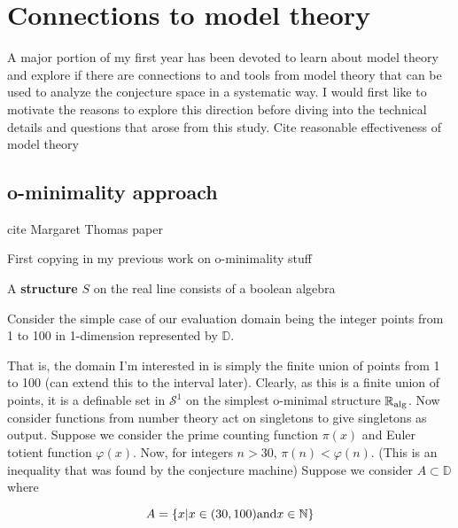 \section{Connections to model theory}
A major portion of my first year has been devoted to learn about model theory and explore if there are connections to and tools from model theory that can be used to analyze the conjecture space in a systematic way. I would first like to motivate the reasons to explore this direction before diving into the technical details and questions that arose from this study.
Cite reasonable effectiveness of model theory \cite{baldwin2019reasonable}

% 
\subsection{o-minimality approach}

cite Margaret Thomas paper \cite{thomasConvergenceResultsFunction2012}

First copying in my previous work on o-minimality stuff

\begin{definition}[Structure]
    A \textbf{structure} $S$ on the real line consists of a boolean algebra
\end{definition}

Consider the simple case of our evaluation domain being the integer points from 1 to 100 in 1-dimension represented by $\mathbb{D}$.

That is, the domain I'm interested in is simply the finite union of points from 1 to 100 (can extend this to the interval later). Clearly, as this is a finite union of points, it is a definable set in $\mathcal{S}^1$ on the simplest o-minimal structure $\mathbb{R}_{\text{alg}}$.
Now consider functions from number theory act on singletons to give singletons as output. Suppose we consider the prime counting function $\pi(x)$ and Euler totient function $\varphi(x)$. Now, for integers $n > 30$, $\pi(n) < \varphi(n)$. (This is an inequality that was found by the conjecture machine)
Suppose we consider $A\subset\mathbb{D}$ where

\begin{equation*}
    A = \{x | x\in (30, 100) \text{and} x\in\mathbb{N} \}
\end{equation*}

